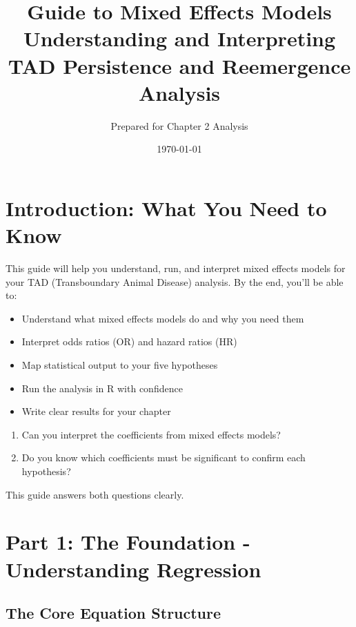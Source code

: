 \documentclass[11pt,a4paper]{article}
\title{\textbf{ Guide to Mixed Effects Models} \\ \large Understanding and Interpreting TAD Persistence and Reemergence Analysis}
\author{Prepared for Chapter 2 Analysis}
\date{\today}
\begin{document}
\maketitle
\tableofcontents
\newpage

\section{Introduction: What You Need to Know}

This guide will help you understand, run, and interpret mixed effects models for your TAD (Transboundary Animal Disease) analysis. By the end, you'll be able to:

\begin{itemize}[leftmargin=*]
    \item Understand what mixed effects models do and why you need them
    \item Interpret odds ratios (OR) and hazard ratios (HR)
    \item Map statistical output to your five hypotheses
    \item Run the analysis in R with confidence
    \item Write clear results for your chapter
\end{itemize}

\begin{keypoint}

\begin{enumerate}
    \item Can you interpret the coefficients from mixed effects models?
    \item Do you know which coefficients must be significant to confirm each hypothesis?
\end{enumerate}
This guide answers both questions clearly.
\end{keypoint}

\section{Part 1: The Foundation - Understanding Regression}

\subsection{The Core Equation Structure}
\end{document}
